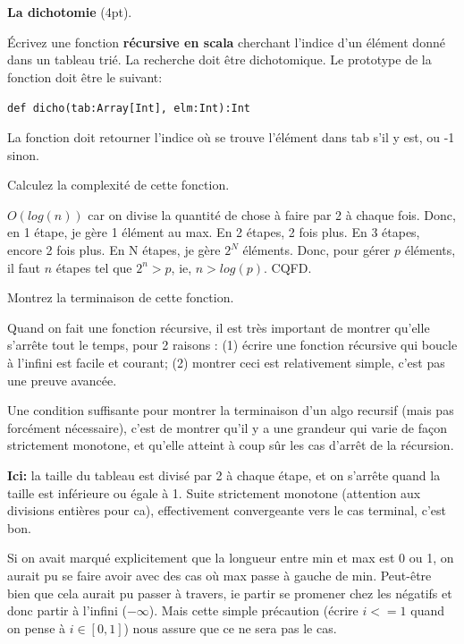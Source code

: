 \documentclass[10pt]{article}\usepackage[nu]{esial}
\begin{document}
\bigskip
\Exercice \textbf{La dichotomie} (4pt).

\Question %
  Écrivez une fonction \textbf{récursive en scala} cherchant l'indice d'un élément donné dans un
  tableau trié. La recherche doit être dichotomique. Le prototype de la fonction doit être le suivant:

  \texttt{def dicho(tab:Array[Int], elm:Int):Int}

  \noindent La fonction doit retourner l'indice où se trouve l'élément
  dans tab s'il y est, ou -1 sinon.

\Question Calculez la complexité de cette fonction.
\begin{Reponse}
  $O( log(n) )$ car on divise la quantité de chose à
  faire par 2 à chaque fois. Donc, en 1 étape, je gère 1 élément au max. En 2
  étapes, 2 fois plus. En 3 étapes, encore 2 fois plus. En N étapes, je gère
  $2^N$ éléments. Donc, pour gérer $p$ éléments, il faut $n$ étapes tel que
  $2^n>p$, ie, $n>log(p)$. CQFD.  
\end{Reponse}

\Question Montrez la terminaison de cette fonction.
\begin{Reponse}
  Quand on fait une fonction récursive, il est très important de montrer
  qu'elle s'arrête tout le temps, pour 2 raisons : (1) écrire une fonction
  récursive qui boucle à l'infini est facile et courant; (2) montrer ceci est
  relativement simple, c'est pas une preuve avancée.

  Une condition suffisante pour montrer la terminaison d'un algo recursif (mais
  pas forcément nécessaire), c'est de montrer qu'il y a une grandeur qui varie
  de façon strictement monotone, et qu'elle atteint à coup sûr les cas d'arrêt
  de la récursion. 

  \textbf{Ici:} la taille du tableau est divisé par 2 à chaque étape, et on
  s'arrête quand la taille est inférieure ou égale à 1.  Suite strictement
  monotone (attention aux divisions entières pour ca), effectivement
  convergeante vers le cas terminal, c'est bon.

  Si on avait marqué explicitement que la longueur entre min et max est 0 ou 1,
  on aurait pu se faire avoir avec des cas où max passe à gauche de
  min. Peut-être bien que cela aurait pu passer à travers, ie partir se
  promener chez les négatifs et donc partir à l'infini ($-\infty$). Mais cette
  simple précaution (écrire $i<=1$ quand on pense à $i\in[0,1]$) nous assure que ce
  ne sera pas le cas.
\end{Reponse}
\end{document}
